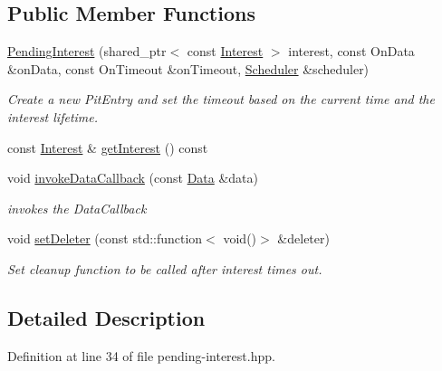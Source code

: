\subsection*{Public Member Functions}
\begin{DoxyCompactItemize}
\item 
\hyperlink{classndn_1_1PendingInterest_a2a2fc0e0e29bfcb0bc2caaa5cdc2236c}{Pending\+Interest} (shared\+\_\+ptr$<$ const \hyperlink{classndn_1_1Interest}{Interest} $>$ interest, const On\+Data \&on\+Data, const On\+Timeout \&on\+Timeout, \hyperlink{classndn_1_1util_1_1scheduler_1_1Scheduler}{Scheduler} \&scheduler)
\begin{DoxyCompactList}\small\item\em Create a new Pit\+Entry and set the timeout based on the current time and the interest lifetime. \end{DoxyCompactList}\item 
const \hyperlink{classndn_1_1Interest}{Interest} \& \hyperlink{classndn_1_1PendingInterest_a493b1545d78ab0873e61bbd3eab94056}{get\+Interest} () const
\item 
void \hyperlink{classndn_1_1PendingInterest_afdbcf4e6d022c0298878d200e9e1c3da}{invoke\+Data\+Callback} (const \hyperlink{classndn_1_1Data}{Data} \&data)
\begin{DoxyCompactList}\small\item\em invokes the Data\+Callback \end{DoxyCompactList}\item 
void \hyperlink{classndn_1_1PendingInterest_a44c80adf0726cbeae49f0e32b750b635}{set\+Deleter} (const std\+::function$<$ void()$>$ \&deleter)\hypertarget{classndn_1_1PendingInterest_a44c80adf0726cbeae49f0e32b750b635}{}\label{classndn_1_1PendingInterest_a44c80adf0726cbeae49f0e32b750b635}

\begin{DoxyCompactList}\small\item\em Set cleanup function to be called after interest times out. \end{DoxyCompactList}\end{DoxyCompactItemize}


\subsection{Detailed Description}


Definition at line 34 of file pending-\/interest.\+hpp.



